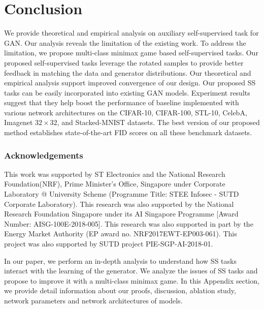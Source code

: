 \documentclass{article}
\begin{document}
 
\section{Conclusion}

We provide theoretical and empirical analysis on auxiliary self-supervised task for GAN.
Our analysis reveals
the limitation of the existing work. To address the limitation, we propose multi-class minimax game based self-supervised tasks.
Our 
proposed self-supervised tasks leverage the rotated samples to provide better feedback in matching the data and generator distributions.
Our theoretical and empirical analysis support improved convergence of our design.
Our proposed SS tasks can be easily incorporated into existing GAN models. Experiment results suggest that they help boost the performance of baseline implemented with various network architectures on the CIFAR-10, CIFAR-100, STL-10, CelebA, Imagenet $32\times32$, and Stacked-MNIST datasets. The best version of our proposed method establishes state-of-the-art FID scores on all these benchmark datasets.

 





\pagebreak

\subsubsection*{Acknowledgements}

This work was  supported by ST Electronics and the National Research Foundation(NRF), Prime Minister's Office, Singapore under Corporate Laboratory @ University Scheme (Programme Title: STEE Infosec - SUTD Corporate Laboratory). This research was also supported by the National Research Foundation Singapore under its AI Singapore Programme [Award Number: AISG-100E-2018-005].
This research was also supported in part by the Energy Market Authority (EP award no. NRF2017EWT-EP003-061).
This project was  also supported by SUTD project PIE-SGP-AI-2018-01.
 
  
{\small
 
}



\clearpage
\appendix

In our paper, we perform an in-depth analysis to understand how SS tasks interact with the learning of the generator. We analyze the issues of SS tasks and propose to improve it with a multi-class minimax game. 
In this Appendix section, we provide detail information about our proofs, discussion, ablation study, network parameters and network architectures of models.
\end{document}
